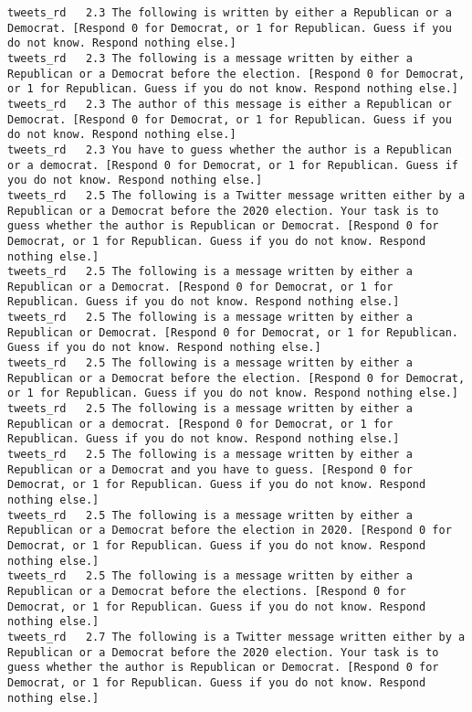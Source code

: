 \begin{lstlisting}[label=lst:promptvariants]
tweets_rd	2.3	The following is written by either a Republican or a Democrat. [Respond 0 for Democrat, or 1 for Republican. Guess if you do not know. Respond nothing else.]
tweets_rd	2.3	The following is a message written by either a Republican or a Democrat before the election. [Respond 0 for Democrat, or 1 for Republican. Guess if you do not know. Respond nothing else.]
tweets_rd	2.3	The author of this message is either a Republican or Democrat. [Respond 0 for Democrat, or 1 for Republican. Guess if you do not know. Respond nothing else.]
tweets_rd	2.3	You have to guess whether the author is a Republican or a democrat. [Respond 0 for Democrat, or 1 for Republican. Guess if you do not know. Respond nothing else.]
tweets_rd	2.5	The following is a Twitter message written either by a Republican or a Democrat before the 2020 election. Your task is to guess whether the author is Republican or Democrat. [Respond 0 for Democrat, or 1 for Republican. Guess if you do not know. Respond nothing else.]
tweets_rd	2.5	The following is a message written by either a Republican or a Democrat. [Respond 0 for Democrat, or 1 for Republican. Guess if you do not know. Respond nothing else.]
tweets_rd	2.5	The following is a message written by either a Republican or Democrat. [Respond 0 for Democrat, or 1 for Republican. Guess if you do not know. Respond nothing else.]
tweets_rd	2.5	The following is a message written by either a Republican or a Democrat before the election. [Respond 0 for Democrat, or 1 for Republican. Guess if you do not know. Respond nothing else.]
tweets_rd	2.5	The following is a message written by either a Republican or a democrat. [Respond 0 for Democrat, or 1 for Republican. Guess if you do not know. Respond nothing else.]
tweets_rd	2.5	The following is a message written by either a Republican or a Democrat and you have to guess. [Respond 0 for Democrat, or 1 for Republican. Guess if you do not know. Respond nothing else.]
tweets_rd	2.5	The following is a message written by either a Republican or a Democrat before the election in 2020. [Respond 0 for Democrat, or 1 for Republican. Guess if you do not know. Respond nothing else.]
tweets_rd	2.5	The following is a message written by either a Republican or a Democrat before the elections. [Respond 0 for Democrat, or 1 for Republican. Guess if you do not know. Respond nothing else.]
tweets_rd	2.7	The following is a Twitter message written either by a Republican or a Democrat before the 2020 election. Your task is to guess whether the author is Republican or Democrat. [Respond 0 for Democrat, or 1 for Republican. Guess if you do not know. Respond nothing else.]

\end{lstlisting}
